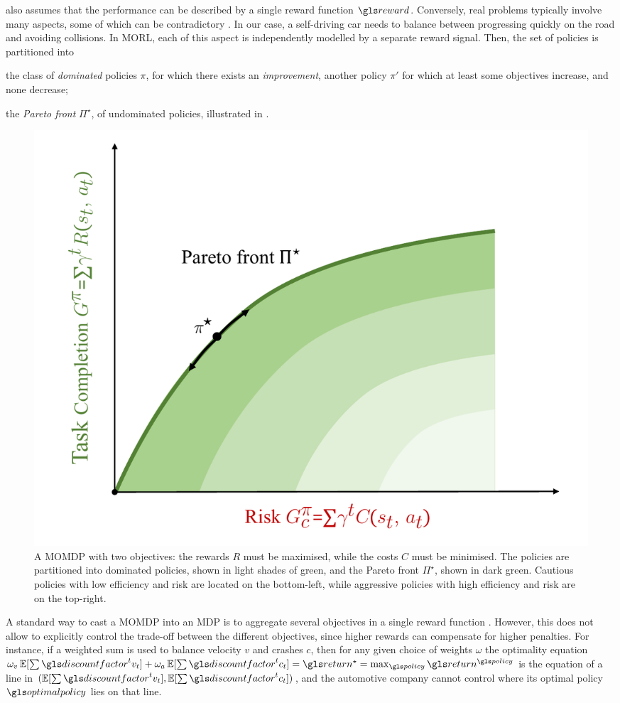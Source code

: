  also assumes that the performance can be described by a single reward function $\reward$. Conversely, real problems typically involve many aspects, some of which can be contradictory \citep{Liu2014}. In our case, a self-driving car needs to balance between progressing quickly on the road and avoiding collisions. In \gls{MORL}, each of this aspect is independently modelled by a separate reward signal. Then, the set of policies is partitioned into 
\begin{enumerate*}[label=(\roman*)]
	\item the class of \emph{dominated} policies $\pi$, for which there exists an \emph{improvement}, \ie another policy $\pi'$ for which at least some objectives increase, and none decrease;
	\item the \emph{Pareto front} $\Pi^\star$, of undominated policies, illustrated in .
\end{enumerate*}

\begin{figure}[ht]
\centering
\includegraphics[width=0.55\linewidth]{img/pareto1}
\caption{A \gls{MOMDP} with two objectives: the rewards $R$ must be maximised, while the costs $C$ must be minimised. The policies are partitioned into dominated policies, shown in light shades of green, and the Pareto front $\Pi^\star$, shown in dark green. Cautious policies with low efficiency and risk are located on the bottom-left, while aggressive policies with high efficiency and risk are on the top-right.}
\label{fig:pareto-front}
\end{figure}

A standard way to cast a \gls{MOMDP} into an \gls{MDP} is to aggregate several objectives in a single reward function \citep{Roijers2013ASO}. However, this does not allow to explicitly control the trade-off between the different objectives, since higher rewards can compensate for higher penalties. For instance, if a weighted sum is used to balance velocity $v$ and crashes $c$, then for any given choice of weights $\omega$ the optimality equation $\omega_v\expectedvalue[\sum\discountfactor^t v_t] + \omega_a\expectedvalue[\sum\discountfactor^t c_t] = \return^{\star} = \max_{\policy} \return^{\policy}$ is the equation of a line in $(\expectedvalue[\sum\discountfactor^t v_t], \expectedvalue[\sum\discountfactor^t c_t])$, and the automotive company cannot control where its optimal policy $\optimalpolicy$ lies on that line. 

